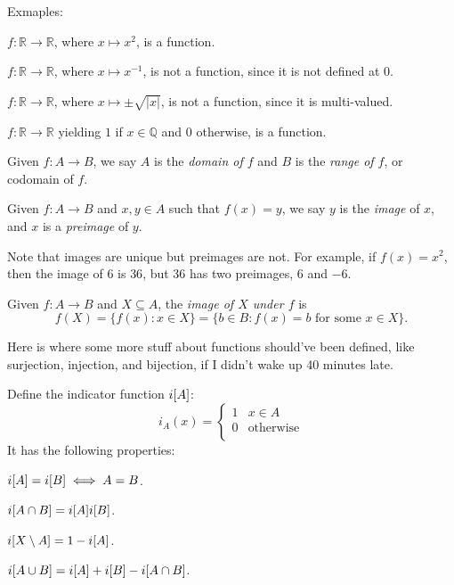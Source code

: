 \documentclass[12pt]{article}
\begin{document}
Exmaples:
\begin{compactenum}[(1)]
\item $f: \mathbb{R} \to \mathbb{R}$, where $x \mapsto x^{2}$, is a function.
\item $f: \mathbb{R} \to \mathbb{R}$, where $x \mapsto x^{-1}$, is not a function, 
    since it is not defined at $0$.
\item $f: \mathbb{R} \to \mathbb{R}$, where $x \mapsto \pm\sqrt{|x|}$, is not a function,
    since it is multi-valued.
\item $f: \mathbb{R} \to \mathbb{R}$ yielding $1$ if $x \in \mathbb{Q}$ and $0$ otherwise,
    is a function.
\end{compactenum}

\begin{definition}
    Given $f: A \to B$, we say $A$ is the \emph{domain of $f$}
    and $B$ is the \emph{range of $f$}, or codomain of $f$.
\end{definition}

\begin{definition}
    Given $f: A \to B$ and $x,y \in A$ such that $f(x) = y$,
    we say $y$ is the \emph{image} of $x$,
    and $x$ is a \emph{preimage} of $y$.
\end{definition}

Note that images are unique but preimages are not. 
For example, if $f(x) = x^{2}$, then
the image of $6$ is $36$, but $36$ has two preimages, $6$ and $-6$.

\begin{definition}
    Given $f: A \to B$ and $X \subseteq A$,
    the \emph{image of $X$ under $f$} is
    \[
        f(X) = \{f(x) : x \in X\} = \{b \in B : f(x) = b \text{ for some } x \in X\}.
    \]
\end{definition}

Here is where some more stuff about functions
should've been defined, like surjection, injection,
and bijection, if I didn't wake up 40 minutes late.

Define the indicator function $i[A]$:
\[
i_A(x) = \begin{cases}
    1 & x \in A\\
    0 & \text{otherwise}\\
\end{cases}
\]
It has the following properties:
\begin{compactenum}[(i)]
\item $i[A] = i[B] \iff A = B$.
\item $i[A\cap B] = i[A] i[B]$.
\item $i[X\setminus A] = 1 - i[A]$.
\item $i[A\cup B] = i[A] + i[B] - i[A \cap B]$.
\end{compactenum}
\end{document}
